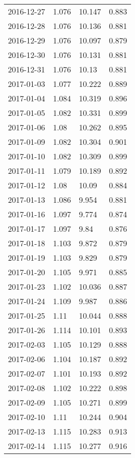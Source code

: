 \begin{center}
\begin{longtable}{r lll}
    2016-12-27 & 1.076  & 10.147 & 0.883  \\
    2016-12-28 & 1.076  & 10.136 & 0.881  \\
    2016-12-29 & 1.076  & 10.097 & 0.879  \\
    2016-12-30 & 1.076  & 10.131 & 0.881  \\
    2016-12-31 & 1.076  & 10.13  & 0.881  \\
    2017-01-03 & 1.077  & 10.222 & 0.889  \\
    2017-01-04 & 1.084  & 10.319 & 0.896  \\
    2017-01-05 & 1.082  & 10.331 & 0.899  \\
    2017-01-06 & 1.08   & 10.262 & 0.895  \\
    2017-01-09 & 1.082  & 10.304 & 0.901  \\
    2017-01-10 & 1.082  & 10.309 & 0.899  \\
    2017-01-11 & 1.079  & 10.189 & 0.892  \\
    2017-01-12 & 1.08   & 10.09  & 0.884  \\
    2017-01-13 & 1.086  & 9.954  & 0.881  \\
    2017-01-16 & 1.097  & 9.774  & 0.874  \\
    2017-01-17 & 1.097  & 9.84   & 0.876  \\
    2017-01-18 & 1.103  & 9.872  & 0.879  \\
    2017-01-19 & 1.103  & 9.829  & 0.879  \\
    2017-01-20 & 1.105  & 9.971  & 0.885  \\
    2017-01-23 & 1.102  & 10.036 & 0.887  \\
    2017-01-24 & 1.109  & 9.987  & 0.886  \\
    2017-01-25 & 1.11   & 10.044 & 0.888  \\
    2017-01-26 & 1.114  & 10.101 & 0.893  \\
    2017-02-03 & 1.105  & 10.129 & 0.888  \\
    2017-02-06 & 1.104  & 10.187 & 0.892  \\
    2017-02-07 & 1.101  & 10.193 & 0.892  \\
    2017-02-08 & 1.102  & 10.222 & 0.898  \\
    2017-02-09 & 1.105  & 10.271 & 0.899  \\
    2017-02-10 & 1.11   & 10.244 & 0.904  \\
    2017-02-13 & 1.115  & 10.283 & 0.913  \\
    2017-02-14 & 1.115  & 10.277 & 0.916  \\

\end{longtable}
\end{center}
